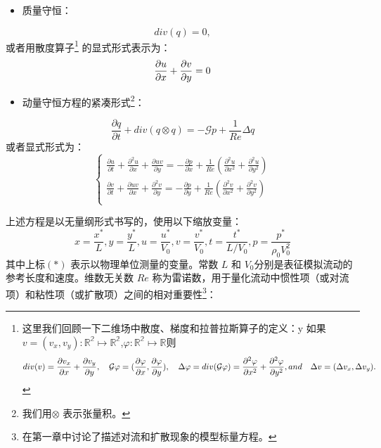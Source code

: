 \documentclass[12pt, a4paper]{article}
\numberwithin{equation}{section} %
\begin{document}
\begin{itemize}
    \item 质量守恒：
\end{itemize}
\begin{equation}
div(q) = 0,
\end{equation}或者用散度算子\footnote{
这里我们回顾一下二维场中散度、梯度和拉普拉斯算子的定义：y
如果 $v = (v_x,v_y): \mathbb{R^2} \mapsto \mathbb{R^2}$,$\varphi:\mathbb{R^2} \mapsto \mathbb{R}$则
\begin{equation}
div(v) = \frac{\partial v_x}{\partial x} + \frac{\partial v_y}{\partial y}, \quad 
\mathcal{G}\varphi = (\frac{\partial \varphi}{\partial x} , \frac{\partial \varphi}{\partial y}),\quad
	\Delta{\varphi} =div(\mathcal{G}\varphi)  =  \frac{\partial ^2 \varphi}{\partial x^2} + \frac{\partial ^2 \varphi}{\partial y^2},\quad \\ and\quad\Delta{v}   =  (\Delta{v_x},\Delta{v_y}).
\notag
\end{equation}} 的显式形式表示为：
\begin{equation}
\frac{\partial u}{\partial x} + \frac{\partial v}{\partial y} = 0
\label{eq:div}
\notag
\end{equation}
\begin{itemize}
    \item 动量守恒方程的紧凑形式\footnote{我们用$\otimes$ 表示张量积。}：
\end{itemize}
\begin{equation}
\frac{\partial q}{\partial t} + div(q\otimes q) = -\mathcal{G}p + \frac{1}{Re} \Delta q 
\end{equation}
或者显式形式为：
\begin{equation}
\left\{
\begin{aligned}
\frac{\partial u}{\partial t} + \frac{\partial ^2 u}{\partial x}+ \frac{\partial uv}{\partial y} = -\frac{\partial p}{\partial x} + \frac{1}{Re} (\frac{\partial ^2 u}{\partial x^2}+\frac{\partial ^2 u}{\partial y^2})\\
\frac{\partial v}{\partial t} + \frac{\partial uv}{\partial x}+ \frac{\partial ^2 v}{\partial y} = -\frac{\partial p}{\partial y} + \frac{1}{Re} (\frac{\partial ^2 v}{\partial x^2}+\frac{\partial ^2 v}{\partial y^2})\\
\end{aligned}
\right.
\label{eq:ns}
\end{equation}




上述方程是以无量纲形式书写的，使用以下缩放变量：
\begin{equation}
x = \frac{x^{\ast}}{L},y = \frac{y^{\ast}}{L},u = \frac{u^{\ast}}{V_0},v=\frac{v^{\ast}}{V_0},t =\frac{t^{\ast}}{L/{V_0}},p =\frac{p^{\ast}}{\rho_0 V_0^2}
\end{equation}
其中上标$(\ast)$ 表示以物理单位测量的变量。常数 $L$ 和 $V_0 $分别是表征模拟流动的参考长度和速度。维数无关数 $Re$ 称为雷诺数，用于量化流动中惯性项（或对流项）和粘性项（或扩散项）之间的相对重要性\footnote{在第一章中讨论了描述对流和扩散现象的模型标量方程。}：
\end{document}
